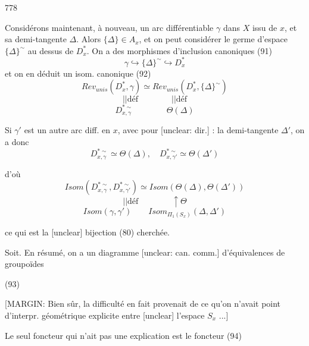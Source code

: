 \newpage


778

Considérons maintenant, à nouveau, un
arc différentiable $\gamma$ dans $X$ issu de $x$,
et sa demi-tangente $\Delta$. Alors $\{\Delta\} \in A_x$,
et on peut considérer le germe d'espace
$\{\Delta\}^\sim$ au dessus de $D_x^*$. On a des
morphismes d'inclusion canoniques
(91) $$\gamma \hookrightarrow \{\Delta\}^\sim \hookrightarrow D_x^*$$
et on en déduit un isom. canonique
(92) $$Rev_{unis}(D_x^*, \gamma) \simeq Rev_{unis}(D_x^*, \{\Delta\}^\sim)$$
$$|| \text{déf} \quad \quad \quad \quad || \text{déf}$$
$$D_{x, \gamma}^{* \sim} \quad \quad \quad \quad \Theta(\Delta)$$

Si $\gamma'$ est un autre arc diff. en $x$, avec
pour [unclear: dir.] : la demi-tangente $\Delta'$, on a donc
$$D_{x, \gamma}^{* \sim} \simeq \Theta(\Delta), \quad D_{x, \gamma'}^{* \sim} \simeq \Theta(\Delta')$$

d'où
$$Isom(D_{x, \gamma}^{* \sim}, D_{x, \gamma'}^{* \sim}) \simeq Isom(\Theta(\Delta), \Theta(\Delta'))$$
$$|| \text{déf} \quad \quad \quad \quad \uparrow \Theta$$
$$Isom(\gamma, \gamma') \quad \quad Isom_{\Pi_1(S_x)}(\Delta, \Delta')$$

ce qui est la [unclear] bijection (80) cherchée.

Soit. En résumé, on a un diagramme
[unclear: can. comm.] d'équivalences de groupoïdes

\newpage


(93)

[MARGIN: Bien sûr, la difficulté en fait provenait de ce qu'on n'avait point d'interpr. géométrique explicite entre [unclear] l'espace $S_x$ ...]

Le seul foncteur qui n'ait pas une
explication est le foncteur
(94)

